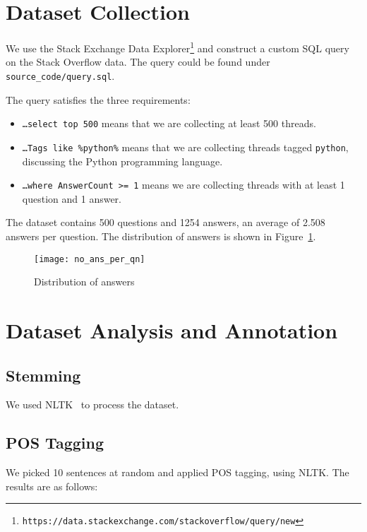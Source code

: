 \section{Dataset Collection}

We use the Stack Exchange Data
Explorer\footnote{\texttt{https://data.stackexchange.com/stackoverflow/query/new}}
and construct a custom SQL query on the Stack Overflow data. The query could be
found under \texttt{source\_code/query.sql}.

The query satisfies the three requirements:

\begin{itemize}
    \item \texttt{\ldots select top 500} means that we are collecting at least
    500 threads.
    \item \texttt{\ldots Tags like \textquotesingle{}\%python\%\textquotesingle{}}
    means that we are collecting threads tagged \texttt{python}, discussing the
    Python programming language.
    \item \texttt{\ldots where AnswerCount >= 1} means we are collecting
    threads with at least 1 question and 1 answer.
\end{itemize}

The dataset contains 500 questions and 1254 answers, an average of 2.508 answers
per question. The distribution of answers is shown in Figure~\ref{ans-dist}.

\begin{figure}[h]
\texttt{[image: no\_ans\_per\_qn]}
\caption{Distribution of answers}\label{ans-dist}
\end{figure}

\section{Dataset Analysis and Annotation}

\subsection{Stemming}

We used NLTK~\cite{nltk} to process the dataset.

\subsection{POS Tagging}

We picked 10 sentences at random and applied POS tagging, using NLTK\@.
The results are as follows:


